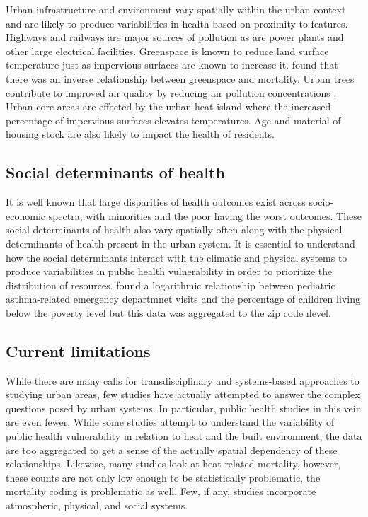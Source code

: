 Urban infrastructure and environment vary spatially within the urban context and are likely to produce variabilities in health based on proximity to features.
Highways and railways are major sources of pollution as are power plants and other large electrical facilities.
Greenspace is known to reduce land surface temperature just as impervious surfaces are known to increase it.
\citet{villeneuveCohortStudyRelating2012b} found that there was an inverse relationship between greenspace and mortality.
Urban trees contribute to improved air quality by reducing air pollution concentrations \citep{nowakAirPollutionRemoval2006}.
Urban core areas are effected by the urban heat island where the increased percentage of impervious surfaces elevates temperatures.
Age and material of housing stock are also likely to impact the health of residents.

\subsection{Social determinants of health}

It is well known that large disparities of health outcomes exist across socio-economic spectra, with minorities and the poor having the worst outcomes.
These social determinants of health also vary spatially often along with the physical determinants of health present in the urban system.
It is essential to understand how the social determinants interact with the climatic and physical systems to produce variabilities in public health vulnerability in order to prioritize the distribution of resources.
\citet{babinPediatricPatientAsthmarelated2007} found a logarithmic relationship between pediatric asthma-related emergency departmnet visits and the percentage of children living below the poverty level but this data was aggregated to the zip code ılevel.

\subsection{Current limitations}

While there are many calls for transdisciplinary and systems-based approaches to studying urban areas, few studies have actually attempted to answer the complex questions posed by urban systems.
In particular, public health studies in this vein are even fewer.
While some studies attempt to understand the variability of public health vulnerability in relation to heat and the built environment, the data are too aggregated to get a sense of the actually spatial dependency of these relationships.
Likewise, many studies look at heat-related mortality, however, these counts are not only low enough to be statistically problematic, the mortality coding is problematic as well.
Few, if any, studies incorporate atmospheric, physical, and social systems.

